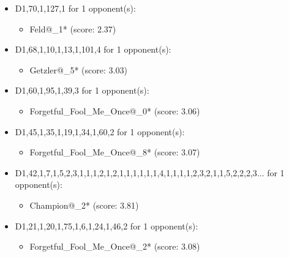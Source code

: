 \begin{appendices}
\begin{itemize}
    \item D1,70,1,127,1 for 1 opponent(s):
    \begin{multicols}{3}
         \begin{itemize}
            \item Feld@\_1* (score: 2.37)
        \end{itemize}
     \end{multicols}
     
    \item D1,68,1,10,1,13,1,101,4 for 1 opponent(s):
    \begin{multicols}{3}
         \begin{itemize}
            \item Getzler@\_5* (score: 3.03)
        \end{itemize}
     \end{multicols}
     
    \item D1,60,1,95,1,39,3 for 1 opponent(s):
    \begin{multicols}{3}
         \begin{itemize}
            \item Forgetful\_Fool\_Me\_Once@\_0* (score: 3.06)
        \end{itemize}
     \end{multicols}
     
    \item D1,45,1,35,1,19,1,34,1,60,2 for 1 opponent(s):
    \begin{multicols}{3}
         \begin{itemize}
            \item Forgetful\_Fool\_Me\_Once@\_8* (score: 3.07)
        \end{itemize}
     \end{multicols}
     
    \item D1,42,1,7,1,5,2,3,1,1,1,2,1,2,1,1,1,1,1,1,4,1,1,1,1,2,3,2,1,1,5,2,2,2,3... for 1 opponent(s):
    \begin{multicols}{3}
         \begin{itemize}
            \item Champion@\_2* (score: 3.81)
        \end{itemize}
     \end{multicols}
     
    \item D1,21,1,20,1,75,1,6,1,24,1,46,2 for 1 opponent(s):
    \begin{multicols}{3}
         \begin{itemize}
            \item Forgetful\_Fool\_Me\_Once@\_2* (score: 3.08)
        \end{itemize}
     \end{multicols}
     

\end{itemize}
\end{appendices}
